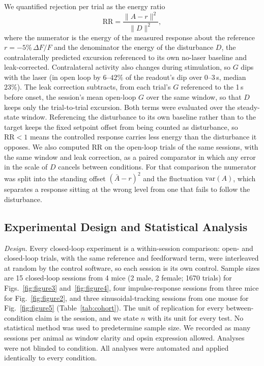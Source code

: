 We quantified rejection per trial as the energy ratio
%
\begin{equation}
    \mathrm{RR} = \frac{\lVert A - r \rVert^{2}}{\lVert D \rVert^{2}},
    \label{eq:rr}
\end{equation}
%
where the numerator is the energy of the measured response about the reference $r = -5\%\,\Delta F/F$ and the denominator the energy of the disturbance $D$, the contralaterally predicted excursion referenced to its own no-laser baseline and leak-corrected.
Contralateral activity also changes during stimulation, so $G$ dips with the laser (in open loop by $6$--$42\%$ of the readout's dip over 0--3\,s, median $23\%$).
The leak correction subtracts, from each trial's $G$ referenced to the 1\,s before onset, the session's mean open-loop $G$ over the same window, so that $D$ keeps only the trial-to-trial excursion.
Both terms were evaluated over the steady-state window.
Referencing the disturbance to its own baseline rather than to the target keeps the fixed setpoint offset from being counted as disturbance, so $\mathrm{RR} < 1$ means the controlled response carries less energy than the disturbance it opposes.
We also computed $\mathrm{RR}$ on the open-loop trials of the same sessions, with the same window and leak correction, as a paired comparator in which any error in the scale of $D$ cancels between conditions.
For that comparison the numerator was split into the standing offset $(\bar{A}-r)^{2}$ and the fluctuation $\mathrm{var}(A)$, which separates a response sitting at the wrong level from one that fails to follow the disturbance.

\subsection*{Experimental Design and Statistical Analysis}
\label{sec:stats}

\emph{Design.} Every closed-loop experiment is a within-session comparison: open- and closed-loop trials, with the same reference and feedforward term, were interleaved at random by the control software, so each session is its own control.
Sample sizes are 15 closed-loop sessions from 4 mice (2 male, 2 female; 1670 trials) for Figs.~\ref{fig:figure3} and~\ref{fig:figure4}, four impulse-response sessions from three mice for Fig.~\ref{fig:figure2}, and three sinusoidal-tracking sessions from one mouse for Fig.~\ref{fig:figure5} (Table~\ref{tab:cohort}).
The unit of replication for every between-condition claim is the session, and we state $n$ with its unit for every test.
No statistical method was used to predetermine sample size.
We recorded as many sessions per animal as window clarity and opsin expression allowed.
Analyses were not blinded to condition.
All analyses were automated and applied identically to every condition.

